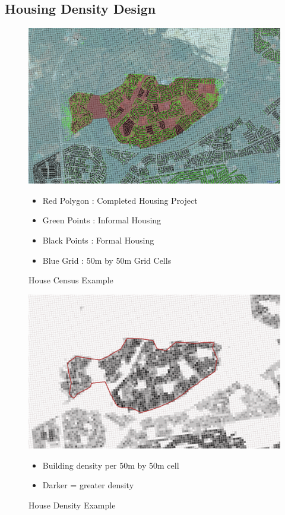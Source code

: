 \documentclass[12pt]{article}
\begin{document}
\subsection{Housing Density Design}\label{appendix:bblupictures}

\begin{figure}
\caption{House Census Example}\label{figure:housecensusexample}
\centering
\includegraphics[scale=.4]{figures/bbludesign3.png}
\begin{itemize}
	\item Red Polygon : Completed Housing Project
	\item Green Points : Informal Housing
	\item Black Points : Formal Housing
	\item Blue Grid : 50m by 50m Grid Cells
\end{itemize}
\end{figure}

\begin{figure}
\caption{House Density Example}\label{figure:housedensityexample}
\centering
\includegraphics[scale=.4]{figures/bbludesign4.png}
\begin{itemize}
	\item Building density per 50m by 50m cell 
	\item Darker = greater density
\end{itemize}

\end{figure}
\end{document}
